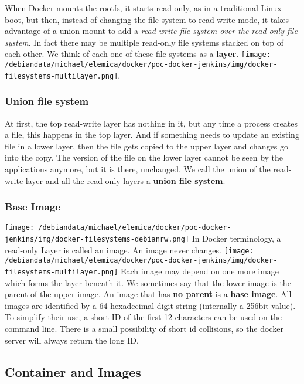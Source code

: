 \documentclass[11pt]{article}
\begin{document}
   When Docker mounts the rootfs, it starts read-only, as in a traditional Linux boot, but then, instead of changing the file system to read-write mode, it takes advantage of a union mount to add a \emph{read-write file system over the read-only file system}. In fact there may be multiple read-only file systems stacked on top of each other. We think of each one of these file systems as a \textbf{layer}. \texttt{[image: /debiandata/michael/elemica/docker/poc-docker-jenkins/img/docker-filesystems-multilayer.png]}.
\subsubsection{Union file system}
\label{sec-2-5-1}

At first, the top read-write layer has nothing in it, but any time a process creates a file, this happens in the top layer. And if something needs to update an existing file in a lower layer, then the file gets copied to the upper layer and changes go into the copy. The version of the file on the lower layer cannot be seen by the applications anymore, but it is there, unchanged. We call the union of the read-write layer and all the read-only layers a \textbf{union file system}.
\subsubsection{Base Image}
\label{sec-2-5-2}

\texttt{[image: /debiandata/michael/elemica/docker/poc-docker-jenkins/img/docker-filesystems-debianrw.png]}
In Docker terminology, a read-only Layer is called an image. An image never changes.
\texttt{[image: /debiandata/michael/elemica/docker/poc-docker-jenkins/img/docker-filesystems-multilayer.png]}
Each image may depend on one more image which forms the layer beneath it. We sometimes say that the lower image is the parent of the upper image. An image that has \textbf{no parent} is a \textbf{base image}.
All images are identified by a 64 hexadecimal digit string (internally a 256bit value). To simplify their use, a short ID of the first 12 characters can be used on the command line. There is a small possibility of short id collisions, so the docker server will always return the long ID.
\subsection{Container and Images}
\label{sec-2-6}
\end{document}
